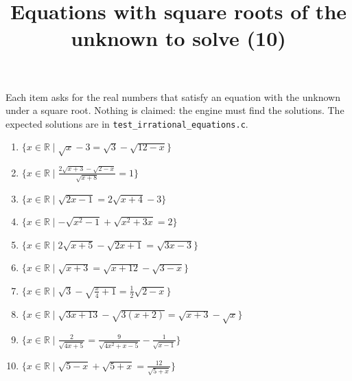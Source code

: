 \documentclass[11pt,a4paper]{article}
\title{Equations with square roots of the unknown to solve (10)}
\author{}
\date{}
\begin{document}
\maketitle
Each item asks for the real numbers that satisfy an equation with the unknown under a square root. Nothing is claimed: the engine must find the solutions. The expected solutions are in \texttt{test\_irrational\_equations.c}.

\begin{enumerate}
\item $\displaystyle \{x \in \mathbb{R} \mid \sqrt{x} - 3 = \sqrt{3} - \sqrt{12 - x}\}$
\item $\displaystyle \{x \in \mathbb{R} \mid \frac{2\sqrt{x + 3} - \sqrt{2 - x}}{\sqrt{x + 8}} = 1\}$
\item $\displaystyle \{x \in \mathbb{R} \mid \sqrt{2x - 1} = 2\sqrt{x + 4} - 3\}$
\item $\displaystyle \{x \in \mathbb{R} \mid -\sqrt{x^{2} - 1} + \sqrt{x^{2} + 3x} = 2\}$
\item $\displaystyle \{x \in \mathbb{R} \mid 2\sqrt{x + 5} - \sqrt{2x + 1} = \sqrt{3x - 3}\}$
\item $\displaystyle \{x \in \mathbb{R} \mid \sqrt{x + 3} = \sqrt{x + 12} - \sqrt{3 - x}\}$
\item $\displaystyle \{x \in \mathbb{R} \mid \sqrt{3} - \sqrt{\frac{x}{4} + 1} = \frac{1}{2}\sqrt{2 - x}\}$
\item $\displaystyle \{x \in \mathbb{R} \mid \sqrt{3x + 13} - \sqrt{3(x + 2)} = \sqrt{x + 3} - \sqrt{x}\}$
\item $\displaystyle \{x \in \mathbb{R} \mid \frac{2}{\sqrt{4x + 5}} = \frac{9}{\sqrt{4x^{2} + x - 5}} - \frac{1}{\sqrt{x - 1}}\}$
\item $\displaystyle \{x \in \mathbb{R} \mid \sqrt{5 - x} + \sqrt{5 + x} = \frac{12}{\sqrt{5 + x}}\}$
\end{enumerate}
\end{document}
